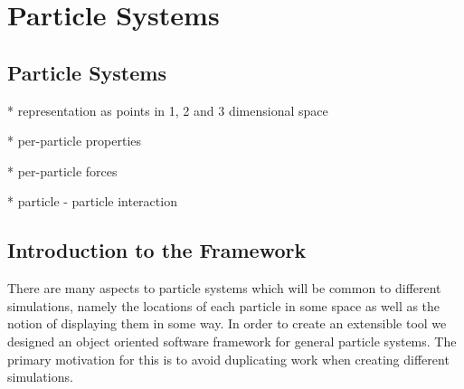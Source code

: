 \chapter{Particle Systems}

\section{Particle Systems}

* representation as points in 1, 2 and 3 dimensional space

* per-particle properties

* per-particle forces

* particle - particle interaction


\section{Introduction to the Framework}

There are many aspects to particle systems which will be common to different
simulations, namely the locations of each particle in some space as well as the
notion of displaying them in some way. In order to create an extensible tool we
designed an object oriented software framework for general particle systems.
The primary motivation for this is to avoid duplicating work when creating
different simulations.




